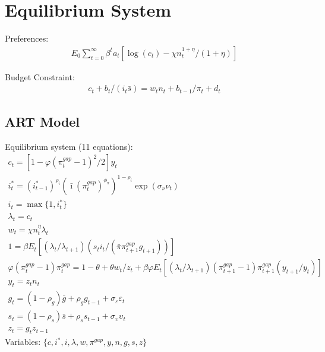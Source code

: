 \documentclass[12pt, final]{article}
\begin{document}
\section{Equilibrium System}

\noindent Preferences:
\begin{gather*}
  E_0\textstyle\sum_{t=0}^\infty\beta^t a_t[\log(c_t)-\chi n_t^{1+\eta}/(1+\eta)]
\end{gather*}

\noindent Budget Constraint:
\begin{gather*}
  c_t+b_t/(i_t\bar{s})=w_tn_t+b_{t-1}/\pi_t+d_t
\end{gather*}

\setcounter{equation}{0}
\subsection{ART Model}
\noindent Equilibrium system (11 equations):
\small\begin{gather}
c_t = [1-\varphi(\pi_t^{gap}-1)^2/2]y_t\\
i_t^*=(i^*_{t-1})^{\rho_i}(\bar{\imath}(\pi^{gap}_t)^{\phi_\pi})^{1-\rho_i}\exp(\sigma_\nu\nu_t)\\
i_t=\max\{1,i_t^*\}\\
\lambda_t = c_t \\
w_t = \chi n_t^\eta \lambda_t\\
1 =  \beta E_t[(\lambda_t/\lambda_{t+1})(s_ti_t/(\bar{\pi}\pi_{t+1}^{gap}g_{t+1}))]\\
\varphi(\pi_t^{gap}-1)\pi_t^{gap} = 1-\theta + \theta w_t/z_t + \beta\varphi E_t[(\lambda_t/\lambda_{t+1})(\pi_{t+1}^{gap}-1)\pi_{t+1}^{gap}(y_{t+1}/y_t)]\\
  y_t=z_t n_t\\  
  g_t= (1-\rho_g)\bar{g}+\rho_gg_{t-1} + \sigma_\varepsilon\varepsilon_t \\
  s_t=(1-\rho_s)\bar{s}+\rho_ss_{t-1} + \sigma_\upsilon\upsilon_t\\
  z_t=g_tz_{t-1}
\end{gather}\normalsize
Variables: $\{c,i^*,i,\lambda,w,\pi^{gap},y,n,g,s,z\}$\\
\end{document}
